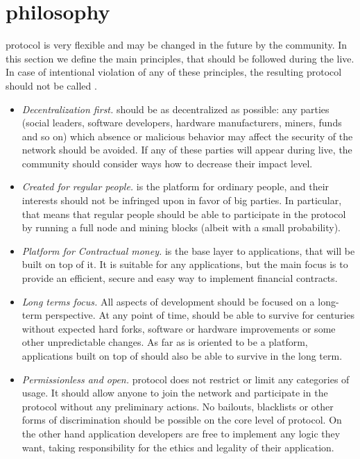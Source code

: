 \section{\Ergo{} philosophy}
\label{sec:social}

\Ergo{} protocol is very flexible and may be changed in the future by the community.
In this section we define the main principles, that should be followed during the \Ergo{} live.
In case of intentional violation of any of these principles, the resulting protocol should not
be called \Ergo{}.

\begin{itemize}
    \item{\em Decentralization first.} \Ergo{} should be as decentralized as possible: any parties (social leaders, software developers, hardware manufacturers, miners, funds and so on)
    which absence or malicious behavior may affect the security of the network should be avoided.
    If any of these parties will appear during \Ergo{} live, the community should consider ways how to decrease their impact level.
    \item{\em Created for regular people.} \Ergo{} is the platform for ordinary people, and their interests should not be infringed upon in favor of big parties.
    In particular, that means that regular people should be able to participate in the protocol by running a full node and mining blocks (albeit with a small probability).
    \item{\em Platform for Contractual money.} \Ergo{} is the base layer to applications, that will be built on top of it.
    It is suitable for any applications, but the main focus is to provide an efficient, secure and easy way to implement financial contracts.
    \item{\em Long terms focus.} All aspects of \Ergo{} development should be focused on a long-term perspective.
    At any point of time, \Ergo{} should be able to survive for centuries without expected hard forks,
    software or hardware improvements or some other unpredictable changes. As far as \Ergo{} is oriented to be a platform, applications built on top of \Ergo{} should also be able to survive in the long term.
    \item{\em Permissionless and open.} \Ergo{} protocol does not restrict or limit any categories of usage.
    It should allow anyone to join the network and participate in the protocol without any preliminary actions.
    No bailouts, blacklists or other forms of discrimination should be possible on the core level of \Ergo{} protocol.
    On the other hand application developers are free to implement any logic they want, taking responsibility for the ethics and legality of their application.
\end{itemize}